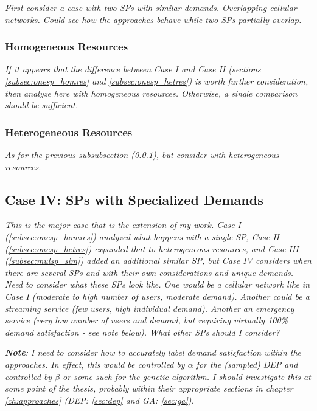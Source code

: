 \documentclass[12pt,dvipsnames]{report}
\begin{document}
\textit{First consider a case with two SPs with similar demands.  Overlapping cellular networks.  Could see how the approaches behave while two SPs partially overlap.}

\subsubsection{Homogeneous Resources} \label{subsubsec:mulsp_sim_homres}

\textit{If it appears that the difference between Case I and Case II (sections \ref{subsec:onesp_homres} and \ref{subsec:onesp_hetres}) is worth further consideration, then analyze here with homogeneous resources.  Otherwise, a single comparison should be sufficient.}

\subsubsection{Heterogeneous Resources} \label{subsubsec:mulsp_sim_hetres}

\textit{As for the previous subsubsection (\ref{subsubsec:mulsp_sim_homres}), but consider with heterogeneous resources.}

\subsection{Case IV: SPs with Specialized Demands} \label{subsec:mulsp_spec}

\textit{This is the major case that is the extension of my work.  Case I (\ref{subsec:onesp_homres}) analyzed what happens with a single SP, Case II (\ref{subsec:onesp_hetres}) expanded that to heterogeneous resources, and Case III (\ref{subsec:mulsp_sim}) added an additional similar SP, but Case IV considers when there are several SPs and with their own considerations and unique demands.  Need to consider what these SPs look like.  One would be a cellular network like in Case I (moderate to high number of users, moderate demand).  Another could be a streaming service (few users, high individual demand).  Another an emergency service (very low number of users and demand, but requiring virtually 100\% demand satisfaction - see note below).  What other SPs should I consider?}

\textit{\textbf{Note}: I need to consider how to accurately label demand satisfaction within the approaches.  In effect, this would be controlled by $\alpha$ for the (sampled) DEP and controlled by $\beta$ or some such for the genetic algorithm.  I should investigate this at some point of the thesis, probably within their appropriate sections in chapter \ref{ch:approaches} (DEP: \ref{sec:dep} and GA: \ref{sec:ga}).}
\end{document}
